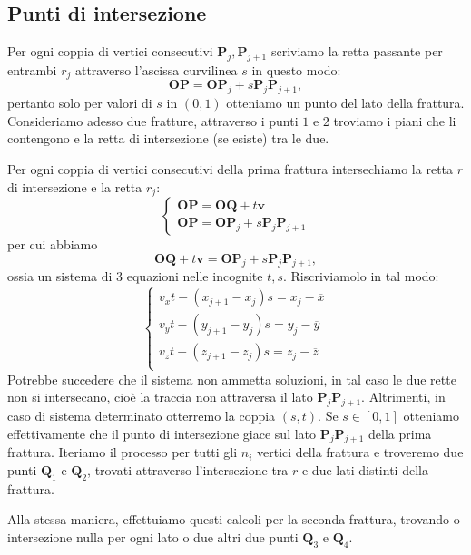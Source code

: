 \documentclass[a4paper]{article}
\newcommand{\B}{\mathbf}
\begin{document}
\subsection{Punti di intersezione}
Per ogni coppia di vertici consecutivi $\B{P}_j,\B{P}_{j+1}$ scriviamo la retta passante per entrambi $r_j$ attraverso l'ascissa curvilinea $s$ in questo modo: 
$$
\B{OP}=\B{OP}_j+s\B{P}_j\B{P}_{j+1},
$$
pertanto solo per valori di $s$ in $(0,1)$ otteniamo un punto del lato della frattura. 
Consideriamo adesso due fratture, attraverso i punti $1$ e $2$ troviamo i piani che li contengono e la retta di intersezione (se esiste) tra le due.

Per ogni coppia di vertici consecutivi della prima frattura intersechiamo la retta $r$ di intersezione e la retta $r_j$:
$$
\begin{cases}
\B{OP}=\B{OQ}+t\B{v} \\ 
\B{OP}=\B{OP}_j+s\B{P}_j\B{P}_{j+1}
\end{cases}
$$
per cui abbiamo $$\B{OQ}+t\B{v}=\B{OP}_j+s\B{P}_j\B{P}_{j+1},$$ ossia un sistema di $3$ equazioni nelle incognite $t,s$. Riscriviamolo in tal modo:
\begin{equation} \label{sis:parametri}
\begin{cases}
v_xt-(x_{j+1}-x_j)s=x_j-\overline{x} \\
v_yt-(y_{j+1}-y_j)s=y_j-\overline{y} \\
v_zt-(z_{j+1}-z_j)s=z_j-\overline{z} \\
\end{cases}
\end{equation}
Potrebbe succedere che il sistema non ammetta soluzioni, in tal caso le due rette non si intersecano, cioè la traccia non attraversa il lato $\B{P}_j\B{P}_{j+1}$. Altrimenti, in caso di sistema determinato otterremo la coppia $(s,t)$. Se $s\in[0,1]$ otteniamo effettivamente che il punto di intersezione giace sul lato $\B{P}_j\B{P}_{j+1}$ della prima frattura. Iteriamo il processo per tutti gli $n_i$ vertici della frattura e troveremo due punti $\B{Q}_1$ e $\B{Q}_2$, trovati attraverso l'intersezione tra $r$ e due lati distinti della frattura.

Alla stessa maniera, effettuiamo questi calcoli per la seconda frattura, trovando o intersezione nulla per ogni lato o due altri due punti $\B{Q}_3$ e $\B{Q}_4$.
\end{document}
